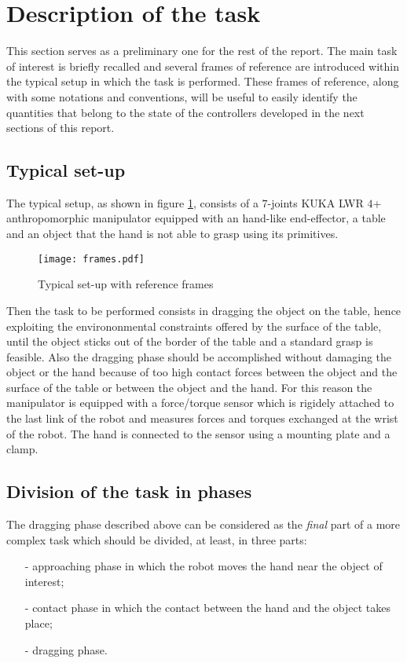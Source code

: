 \section{Description of the task}\label{sec:task_description}
This section serves as a preliminary one for the rest of the report. The main task
of interest is briefly recalled and several frames of reference are introduced within
the typical setup in which the task is performed. These frames of reference, along
with some notations and conventions, will be useful to easily identify the quantities
that belong to the state of the controllers developed in the next sections of this report.

\subsection{Typical set-up}
The typical setup, as shown in figure \ref{fig:frames}, consists of a $7$-joints KUKA LWR $4$+
anthropomorphic manipulator equipped with an hand-like end-effector, a table and an object that the hand is not
able to grasp using its primitives.
\begin{figure}[h]
  \centering
  \texttt{[image: frames.pdf]}
  \caption{Typical set-up with reference frames \label{fig:frames}}
\end{figure}
Then the task to be performed consists in dragging the object on the table, hence exploiting
the environonmental constraints offered by the surface of the table, until the object sticks
out of the border of the table and a standard grasp is feasible. Also the dragging phase should
be accomplished without damaging the object or the hand because of too high contact forces between
the object and the surface of the table or between the object and the hand.
For this reason the manipulator is equipped with a force/torque sensor which is rigidely attached
to the last link of the robot and measures forces and torques exchanged at the wrist of the robot.
The hand is connected to the sensor using a mounting plate and a clamp.

\subsection{Division of the task in phases}\label{sec:task_division}
The dragging phase described above can be considered as the \emph{final} part of a more
complex task which should be divided, at least, in three parts:
\begin{itemize}
\item[-] approaching phase in which the robot moves the hand near the object of interest;
\item[-] contact phase in which the contact between the hand and the object takes place;
\item[-] dragging phase.
\end{itemize}

